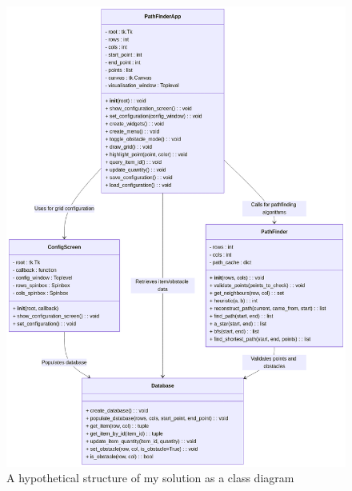 \begin{figure}[!htbp]
	\centering %
	
	\begin{minipage}{0.65\textwidth} %
		\centering
		\includegraphics[width=\linewidth]{Images/classdiag1.png}
		\caption{A hypothetical structure of my solution as a class diagram}
		\label{fig:classdiag1} %
	\end{minipage}%
	\hfill %
	\begin{minipage}{0.27\textwidth} %
		\centering

\end{minipage}
\end{figure}

